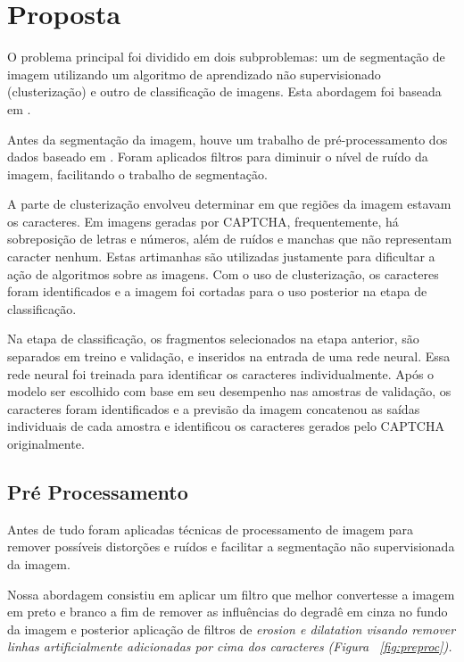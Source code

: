 \documentclass[11pt]{article}
\begin{document}
  \section{Proposta}
  \label{sec:detalhes}

  O problema principal foi dividido em dois subproblemas: um de segmentação de imagem utilizando um algoritmo de aprendizado não supervisionado (clusterização) e outro de classificação de imagens. Esta abordagem foi baseada em \cite{kopp2017}.

Antes da segmentação da imagem, houve um trabalho de pré-processamento dos dados baseado em \cite{proc}. Foram aplicados filtros para diminuir o nível de ruído da imagem, facilitando o trabalho de segmentação. 

A parte de clusterização envolveu determinar em que regiões da imagem estavam os caracteres. Em imagens geradas por CAPTCHA, frequentemente, há sobreposição de letras e números, além de ruídos e manchas que não representam caracter nenhum. Estas artimanhas são utilizadas justamente para dificultar a ação de algoritmos sobre as imagens. Com o uso de clusterização, os caracteres foram identificados e a imagem foi cortadas para o uso posterior na etapa de classificação. 

Na etapa de classificação, os fragmentos selecionados na etapa anterior, são separados em treino e validação, e inseridos na entrada de uma rede neural. Essa rede neural foi treinada para identificar os caracteres individualmente. Após o modelo ser escolhido com base em seu desempenho nas amostras de validação, os caracteres foram identificados e a previsão da imagem concatenou as saídas individuais de cada amostra e identificou os caracteres gerados pelo CAPTCHA originalmente.



\subsection{Pré Processamento}
\label{sec:preprocessing}

Antes de tudo foram aplicadas técnicas de processamento de imagem para remover possíveis distorções e ruídos e facilitar a segmentação não supervisionada da imagem.

Nossa abordagem consistiu em aplicar um filtro que melhor convertesse a imagem em preto e branco a fim de remover as influências do degradê em cinza no fundo da imagem e posterior aplicação de filtros de \em erosion \em e \em dilatation \em visando remover linhas artificialmente adicionadas por cima dos caracteres (Figura ~\ref{fig:preproc}).
\end{document}
